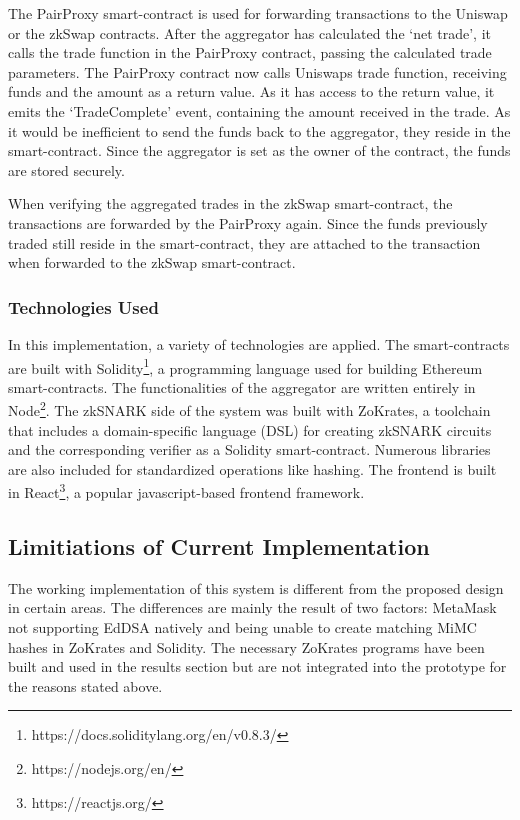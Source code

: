 \documentclass[../../thesis.tex]{subfiles}
\begin{document}
The PairProxy smart-contract is used for forwarding transactions to the Uniswap or the zkSwap contracts. After the aggregator has calculated the `net trade', it calls the trade function in the PairProxy contract, passing the calculated trade parameters. The PairProxy contract now calls Uniswaps trade function, receiving funds and the amount as a return value. As it has access to the return value, it emits the `TradeComplete' event, containing the amount received in the trade. As it would be inefficient to send the funds back to the aggregator, they reside in the smart-contract. Since the aggregator is set as the owner of the contract, the funds are stored securely.

When verifying the aggregated trades in the zkSwap smart-contract, the transactions are forwarded by the PairProxy again. Since the funds previously traded still reside in the smart-contract, they are attached to the transaction when forwarded to the zkSwap smart-contract.

\subsubsection{Technologies Used}
In this implementation, a variety of technologies are applied. The smart-contracts are built with Solidity\footnote{https://docs.soliditylang.org/en/v0.8.3/}, a programming language used for building Ethereum smart-contracts. The functionalities of the aggregator are written entirely in Node\footnote{https://nodejs.org/en/}. The zkSNARK side of the system was built with ZoKrates, a toolchain that includes a domain-specific language (DSL) for creating zkSNARK circuits and the corresponding verifier as a Solidity smart-contract. Numerous libraries are also included for standardized operations like hashing. The frontend is built in React\footnote{https://reactjs.org/}, a popular javascript-based frontend framework. 

\subsection{Limitiations of Current Implementation}
The working implementation of this system is different from the proposed design in certain areas. The differences are mainly the result of two factors: MetaMask not supporting EdDSA natively and being unable to create matching MiMC hashes in ZoKrates and Solidity. The necessary ZoKrates programs have been built and used in the results section but are not integrated into the prototype for the reasons stated above. 
\end{document}
